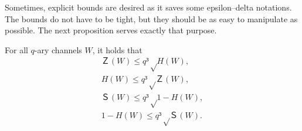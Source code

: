 \documentclass[openany]{amsbook}
\numberwithin{equation}{chapter}
\numberwithin{figure}{chapter}
\numberwithin{table}{chapter}
\theoremstyle{definition}	理dfn:Definition~?s			理exa:Example~?s
\theoremstyle{remark}		理cla:Claim~?s				理rem:Remark~?s
\begin{document}
	Sometimes, explicit bounds are desired as it saves some epsilon--delta notations.
	The bounds do not have to be tight,
	but they should be as easy to manipulate as possible.
	The next proposition serves exactly that purpose.
	
	\begin{pro}\label{pro:ex-toll}
		For all $q$-ary channels $W$, it holds that
		\begin{gather*}
			Ｚ(W)≤q³√{H(W)},		\label{ine:Z<H}\\
			H(W)≤q³√{Ｚ(W)},		\label{ine:H<Z}\\
			Ｓ(W)≤q³√{1-H(W)},	\label{ine:S<1-H}\\
			1-H(W)≤q³√{Ｓ(W)}.	\label{ine:1-H<S}
		\end{gather*}
	\end{pro}
	
\end{document}

